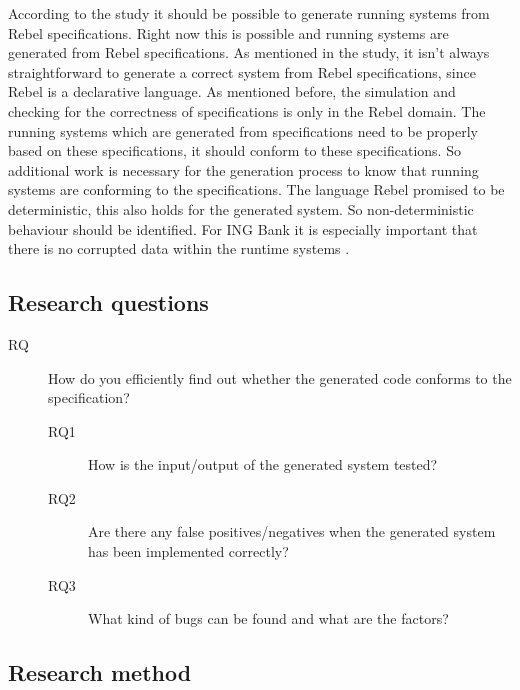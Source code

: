 According to the study \cite[p.3]{stoelcase} it should be possible to generate running systems from Rebel specifications. Right now this is possible and running systems are generated from Rebel specifications. As mentioned in the study, it isn't always straightforward to generate a correct system from Rebel specifications, since Rebel is a declarative language. 
As mentioned before, the simulation and checking for the correctness of specifications is only in the Rebel domain. The running systems which are generated from specifications need to be properly based on these specifications, it should conform to these specifications. So additional work is necessary for the generation process to know that running systems are conforming to the specifications. The language Rebel promised to be deterministic, this also holds for the generated system. So non-deterministic behaviour should be identified. For ING Bank it is especially important that there is no corrupted data within the runtime systems .

\subsection{Research questions}
\label{sec:research-questions}

\begin{description}
  \item [RQ] How do you efficiently find out whether the generated code conforms to the specification?

  \begin{description}
    \item [RQ1] How is the input/output of the generated system tested?
    \item [RQ2] Are there any false positives/negatives when the generated system has been implemented correctly?
    \item [RQ3] What kind of bugs can be found and what are the factors?
  \end{description}

\end{description}

\subsection{Research method}
\label{sec:research-method}


